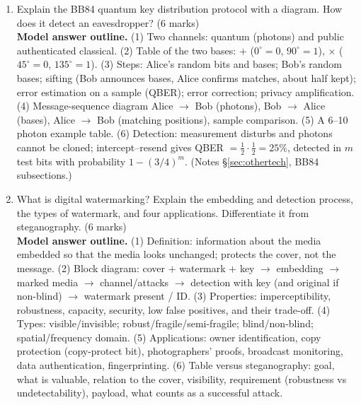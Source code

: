 \begin{enumerate}[leftmargin=1.6em,itemsep=4pt]
  \item Explain the BB84 quantum key distribution protocol with a diagram. How does it detect an eavesdropper? \hfill (6 marks)\\
  \textbf{Model answer outline.} (1) Two channels: quantum (photons) and public authenticated classical. (2) Table of the two bases: $+$ ($0^\circ = 0$, $90^\circ = 1$), $\times$ ($45^\circ = 0$, $135^\circ = 1$). (3) Steps: Alice's random bits and bases; Bob's random bases; sifting (Bob announces bases, Alice confirms matches, about half kept); error estimation on a sample (QBER); error correction; privacy amplification. (4) Message-sequence diagram Alice $\to$ Bob (photons), Bob $\to$ Alice (bases), Alice $\to$ Bob (matching positions), sample comparison. (5) A 6--10 photon example table. (6) Detection: measurement disturbs and photons cannot be cloned; intercept--resend gives QBER $= \frac12 \cdot \frac12 = 25\%$, detected in $m$ test bits with probability $1 - (3/4)^m$. (Notes \S\ref{sec:othertech}, BB84 subsections.)

  \item What is digital watermarking? Explain the embedding and detection process, the types of watermark, and four applications. Differentiate it from steganography. \hfill (6 marks)\\
  \textbf{Model answer outline.} (1) Definition: information about the media embedded so that the media looks unchanged; protects the cover, not the message. (2) Block diagram: cover $+$ watermark $+$ key $\to$ embedding $\to$ marked media $\to$ channel/attacks $\to$ detection with key (and original if non-blind) $\to$ watermark present / ID. (3) Properties: imperceptibility, robustness, capacity, security, low false positives, and their trade-off. (4) Types: visible/invisible; robust/fragile/semi-fragile; blind/non-blind; spatial/frequency domain. (5) Applications: owner identification, copy protection (copy-protect bit), photographers' proofs, broadcast monitoring, data authentication, fingerprinting. (6) Table versus steganography: goal, what is valuable, relation to the cover, visibility, requirement (robustness vs undetectability), payload, what counts as a successful attack.
\end{enumerate}
